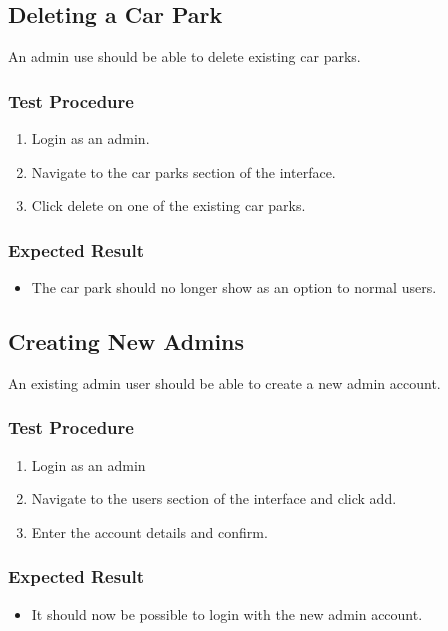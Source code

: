 \documentclass[a4paper, draft]{article}
\begin{document}
\subsection{Deleting a Car Park}
An admin use should be able to delete existing car parks.

\subsubsection{Test Procedure}
\begin{enumerate}
  \item Login as an admin.
  \item Navigate to the car parks section of the interface.
  \item Click delete on one of the existing car parks.
\end{enumerate}

\subsubsection{Expected Result}
\begin{itemize}
  \item The car park should no longer show as an option to normal users.
\end{itemize}

\subsection{Creating New Admins}
An existing admin user should be able to create a new admin account.

\subsubsection{Test Procedure}
\begin{enumerate}
  \item Login as an admin
  \item Navigate to the users section of the interface and click add.
  \item Enter the account details and confirm.
\end{enumerate}

\subsubsection{Expected Result}
\begin{itemize}
  \item It should now be possible to login with the new admin account.
\end{itemize}
\end{document}
